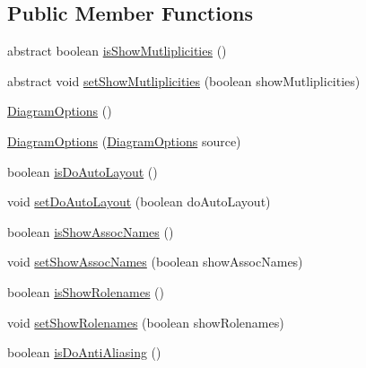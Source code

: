 \subsection*{Public Member Functions}
\begin{DoxyCompactItemize}
\item 
abstract boolean \hyperlink{classorg_1_1tzi_1_1use_1_1gui_1_1views_1_1diagrams_1_1_diagram_options_a3c116b2b519988ce467fcf6a94a4e553}{is\-Show\-Mutliplicities} ()
\item 
abstract void \hyperlink{classorg_1_1tzi_1_1use_1_1gui_1_1views_1_1diagrams_1_1_diagram_options_ac0f690cf4657a4c9051e40df4dcacd90}{set\-Show\-Mutliplicities} (boolean show\-Mutliplicities)
\item 
\hyperlink{classorg_1_1tzi_1_1use_1_1gui_1_1views_1_1diagrams_1_1_diagram_options_a5a2abf99dd21e24072bfe67d6c7c4fc1}{Diagram\-Options} ()
\item 
\hyperlink{classorg_1_1tzi_1_1use_1_1gui_1_1views_1_1diagrams_1_1_diagram_options_a65b8f713604b96b964ea5248e6ce261e}{Diagram\-Options} (\hyperlink{classorg_1_1tzi_1_1use_1_1gui_1_1views_1_1diagrams_1_1_diagram_options}{Diagram\-Options} source)
\item 
boolean \hyperlink{classorg_1_1tzi_1_1use_1_1gui_1_1views_1_1diagrams_1_1_diagram_options_ac351f0a42e9e0cebc856148b62f9b5ad}{is\-Do\-Auto\-Layout} ()
\item 
void \hyperlink{classorg_1_1tzi_1_1use_1_1gui_1_1views_1_1diagrams_1_1_diagram_options_a11aeda0c4d46d3bb180240c56d708e01}{set\-Do\-Auto\-Layout} (boolean do\-Auto\-Layout)
\item 
boolean \hyperlink{classorg_1_1tzi_1_1use_1_1gui_1_1views_1_1diagrams_1_1_diagram_options_a93342b31ee8e6d44a1280b8694ddc52c}{is\-Show\-Assoc\-Names} ()
\item 
void \hyperlink{classorg_1_1tzi_1_1use_1_1gui_1_1views_1_1diagrams_1_1_diagram_options_ab7ae7a9c1a74f52954778e340969f496}{set\-Show\-Assoc\-Names} (boolean show\-Assoc\-Names)
\item 
boolean \hyperlink{classorg_1_1tzi_1_1use_1_1gui_1_1views_1_1diagrams_1_1_diagram_options_a5abc1bb0eb6ed8c599003b41e9a9f76e}{is\-Show\-Rolenames} ()
\item 
void \hyperlink{classorg_1_1tzi_1_1use_1_1gui_1_1views_1_1diagrams_1_1_diagram_options_afb37cb67f3f85c28ecd75dd7c064ba7a}{set\-Show\-Rolenames} (boolean show\-Rolenames)
\item 
boolean \hyperlink{classorg_1_1tzi_1_1use_1_1gui_1_1views_1_1diagrams_1_1_diagram_options_a60909e160343e63ae8303549875080d1}{is\-Do\-Anti\-Aliasing} ()

\end{DoxyCompactItemize}
